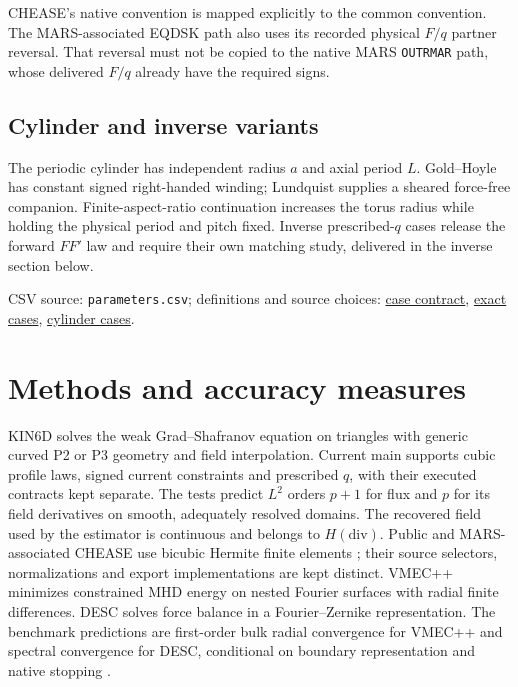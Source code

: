 \documentclass[10pt,a4paper]{article}
\newcommand{\tcroot}{https://gitlab.tugraz.at/plasma/proj/ntv/iter_tc24/-/blob/5f267d12c/}
\newcommand{\tcfile}[2]{\href{\tcroot#1}{#2}}
\newcommand{\dataref}[1]{{\footnotesize CSV source: \texttt{#1}}}
\newcommand{\pageheading}[1]{\clearpage\section{#1}}
\begin{document}
CHEASE's native convention is mapped explicitly to the common convention.
The MARS-associated EQDSK path also uses its recorded physical $F/q$ partner
reversal. That reversal must not be copied to the native MARS
\texttt{OUTRMAR} path, whose delivered $F/q$ already have the required signs.

\subsection*{Cylinder and inverse variants}
The periodic cylinder has independent radius $a$ and axial period $L$.
Gold--Hoyle has constant signed right-handed winding; Lundquist supplies a
sheared force-free companion. Finite-aspect-ratio continuation increases the
torus radius while holding the physical period and pitch fixed. Inverse
prescribed-$q$ cases release the forward $FF'$ law and require their own
matching study, delivered in the inverse section below.

\dataref{parameters.csv}; definitions and source choices:
\tcfile{equilibrium/CASE_CONTRACT.md}{case contract},
\tcfile{equilibrium/phase1/README.md}{exact cases},
\tcfile{equilibrium/phase5/results/README.md}{cylinder cases}.

\pageheading{Methods and accuracy measures}
KIN6D solves the weak Grad--Shafranov equation on triangles with generic curved
P2 or P3 geometry and field interpolation. Current main supports cubic
profile laws, signed current constraints and prescribed $q$, with their
executed contracts kept separate. The tests predict $L^2$ orders
$p+1$ for flux and $p$ for its field derivatives on smooth, adequately resolved
domains. The recovered field used by the estimator is continuous and belongs
to $H(\mathrm{div})$. Public and MARS-associated CHEASE use bicubic Hermite
finite elements \cite{chease}; their source selectors, normalizations and
export implementations are kept distinct. VMEC++ minimizes constrained MHD
energy on nested Fourier surfaces with radial finite differences. DESC solves
force balance in a Fourier--Zernike representation. The benchmark predictions
are first-order bulk radial convergence for VMEC++ and spectral convergence
for DESC, conditional on boundary representation and native stopping
\cite{panici}.
\end{document}
